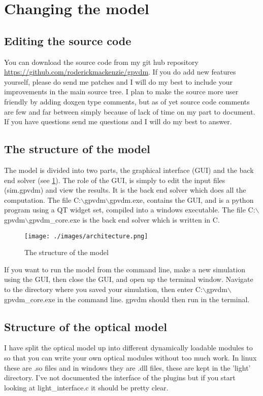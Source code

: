 \section{Changing the model}
\subsection{Editing the source code}
You can download the source code from my git hub repository \url{https://github.com/roderickmackenzie/gpvdm}.  If you do add new features yourself, please do send me patches and I will do my best to include your improvements in the main source tree.  I plan to make the source more user friendly by adding doxgen type comments, but as of yet source code comments are few and far between simply because of lack of time on my part to document.  If you have questions send me questions and I will do my best to answer.

\subsection{The structure of the model}
The model is divided into two parts, the graphical interface (GUI) and the back end solver (see \ref{fig:structureofthemodel}).  The role of the GUI, is simply to edit the input files (sim.gpvdm) and view the results.  It is the back end solver which does all the computation.  The file C:$\backslash$gpvdm$\backslash$gpvdm.exe, contains the GUI, and is a python program using a QT widget set, compiled into a windows executable.  The file C:$\backslash$gpvdm$\backslash$gpvdm\_core.exe is the back end solver which is written in C.
\begin{figure}
\centering
\texttt{[image: ./images/architecture.png]}
\caption{The structure of the model}
\label{fig:structureofthemodel}
\end{figure}
If you want to run the model from the command line, make a new simulation using the GUI, then close the GUI, and open up the terminal window.  Navigate to the directory where you saved your simulation, then enter C:$\backslash$gpvdm$\backslash$gpvdm\_core.exe in the command line.  gpvdm should then run in the terminal.

\subsection{Structure of the optical model}
I have split the optical model up into different dynamically loadable modules to so that you can write your own optical modules without too much work.  In linux these are .so files and in windows they are .dll files, these are kept in the 'light' directory.  I've not documented the interface of the plugins but if you start looking at light\_interface.c it should be pretty clear.

